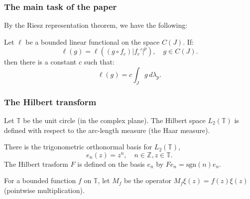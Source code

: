 \documentclass{beamer} %
\theoremstyle{definition} %
\newcommand{\Itgr}{\mathbb{Z}}
\newcommand{\Circ}{\mathbb{T}}
\newcommand{\sgn}{\mathrm{sgn}}
\begin{document}
% 
%     

\begin{frame}\frametitle{The main task of the paper}
    By the Riesz representation theorem, we have the following:
    \begin{theorem}
        Let $\ell$ be a bounded linear functional on the space $C(J)$. If:
        \begin{equation*}
            \ell(g) = \ell((g\circ f_c)|f_c'|^p),\quad g \in C(J).
        \end{equation*}
        then there is a constant $c$ such that:
        \begin{equation*}
            \ell(g) = c\int_{J} g\,d\lambda_p.
        \end{equation*}
    \end{theorem}
\end{frame}


\begin{frame}\frametitle{The Hilbert transform}
    Let $\Circ$ be the unit circle (in the complex plane). The Hilbert space $L_2(\Circ)$ is
    defined with respect to the arc-length measure (the Haar measure).
    
    There is the trigonometric orthonormal basis for $L_2(\Circ)$,
    \begin{equation*}
        e_n(z) = z^n,\quad n\in \Itgr, z \in \Circ.
    \end{equation*}
    The Hilbert trasform $F$ is defined on the basis $e_n$ by $Fe_n = \sgn(n)e_n$.
    
    For a bounded function $f$ on $\Circ$, let $M_f$ be the operator $M_f\xi(z) = f(z)\xi(z)$ (pointwise multiplication).
\end{frame}
\end{document}
